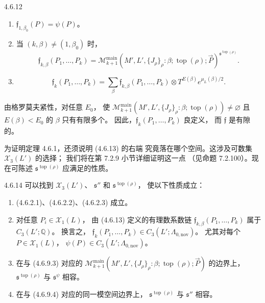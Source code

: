 \begin{definition}{4.6.12}\label{def:4-6-12}
\begin{enumerate}[label=\textup{(4.6.13.\arabic*)},leftmargin=6.1em]
 \item
 $\mathfrak f_{1,\beta_0}(P)=\psi(P)$。
 \item
 当 $(k,\beta)\ne(1,\beta_0)$ 时，
 \[
 \mathfrak f_{k,\beta}(P_1,\ldots,P_k)
 =
 \mathcal M_{k+1}^{\mathrm{main}}
 (M',L',\{J_\rho\}_\rho:\beta;\operatorname{top}(\rho);\vec P)
 ^{\mathfrak s^{\operatorname{top}(\rho)}}.
 \]
 \item
 \[
 \mathfrak f_k(P_1,\ldots,P_k)
 =
 \sum_\beta
 \mathfrak f_{k,\beta}(P_1,\ldots,P_k)
 \otimes T^{E(\beta)}e^{\mu_L(\beta)/2}.
 \]
\end{enumerate}
\end{definition}

由格罗莫夫紧性，对任意 $E_0$，
使
$\mathcal M_{k+1}^{\mathrm{main}}
(M',L',\{J_\rho\}_\rho:\beta;\operatorname{top}(\rho))\ne\varnothing$
且 $E(\beta)<E_0$ 的 $\beta$ 只有有限多个。
因此，$\mathfrak f_k(P_1,\ldots,P_k)$ 良定义，
而 $\mathfrak f$ 是有隙的。

为证明定理 4.6.1，还须说明 (4.6.13) 的右端
究竟落在哪个空间。这涉及可数集
$\mathcal X_3(L')$ 的选择；
我们将在第 7.2.9 小节详细证明这一点
（见命题 7.2.100）。现在可陈述
$\mathfrak s^{\operatorname{top}(\rho)}$
应满足的性质。

\begin{proposition}{4.6.14}\label{prop:4-6-14}
可以找到 $\mathcal X_3(L')$、
$\mathfrak s''$ 和
$\mathfrak s^{\operatorname{top}(\rho)}$，
使以下性质成立：
\begin{enumerate}[label=\textup{(4.6.15.\arabic*)},leftmargin=6.1em]
 \item
 (4.6.2.1)、(4.6.2.2)、(4.6.2.3) 成立。
 \item
 对任意 $P_i\in\mathcal X_1(L)$，
 由 (4.6.13) 定义的有理数系数链
 $\mathfrak f_{k,\beta}(P_1,\ldots,P_k)$
 属于 $C_3(L';\mathbb Q)$。
 换言之，
 $\mathfrak f_k(P_1,\ldots,P_k)
 \in C_3(L';\Lambda_{0,\mathrm{nov}})$。
 尤其对每个 $P\in\mathcal X_1(L)$，
 $\psi(P)\in C_3(L';\Lambda_{0,\mathrm{nov}})$。
 \item
 在与 (4.6.9.3) 对应的
 $\mathcal M_{k+1}^{\mathrm{main}}
 (M',L',\{J_\rho\}_\rho:\beta;\operatorname{top}(\rho);\vec P)$
 的边界上，
 $\mathfrak s^{\operatorname{top}(\rho)}$
 与 $\mathfrak s^\psi$ 相容。
 \item
 在与 (4.6.9.4) 对应的同一模空间边界上，
 $\mathfrak s^{\operatorname{top}(\rho)}$
 与 $\mathfrak s''$ 相容。
\end{enumerate}
\end{proposition}

